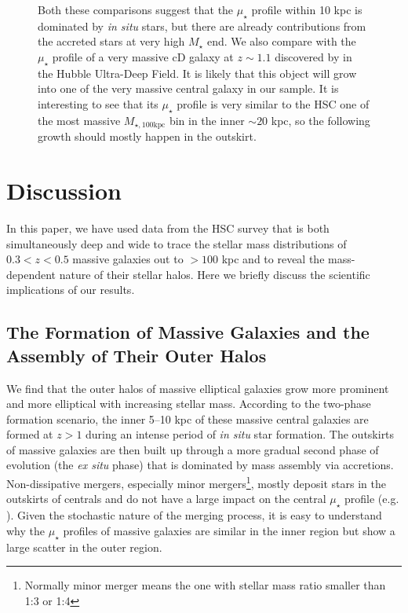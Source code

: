 \documentclass[a4paper,fleqn,usenatbib]{mnras}
\def\mstar{{$M_{\star}$}}
\def\mtot{{$M_{\star,100\mathrm{kpc}}$}}
\def\mden{{$\mu_{\star}$}}
\begin{document}
\begin{figure}
{          Both these comparisons suggest that the \mden{} profile within 10 kpc is 
          dominated by \textit{in situ} stars, but there are already contributions
          from the accreted stars at very high \mstar{} end. 
          We also compare with the \mden{} profile of a very massive cD galaxy at
          $z{\sim} 1.1$ discovered by \citet[][Yellow, dashed]{Liu2013} in the Hubble 
          Ultra-Deep Field. 
          It is likely that this object will grow into one of the very massive central
          galaxy in our sample.
          It is interesting to see that its \mden{} profile is very similar to the 
          HSC one of the most massive \mtot{} bin in the inner $\sim 20$ kpc, so the 
          following growth should mostly happen in the outskirt. 
          }
      \label{fig:discussion_1}
  \end{figure}

\section{Discussion}
    \label{sec:discussion}
    
    In this paper, we have used data from the HSC survey that is both simultaneously 
    deep and wide to trace the stellar mass distributions of $0.3 < z < 0.5$ massive 
    galaxies out to $>100$ kpc and to reveal the mass-dependent nature of their 
    stellar halos.
    Here we briefly discuss the scientific implications of our results.

\subsection{The Formation of Massive Galaxies and the Assembly of Their Outer Halos}
    \label{ssec:twophase}
            
    We find that the outer halos of massive elliptical galaxies grow more prominent 
    and more elliptical with increasing stellar mass.
    According to the two-phase formation scenario, the inner 5--10 kpc of these 
    massive central galaxies are formed at $z>1$ during an intense period of 
    \textit{in situ} star formation. 
    The outskirts of massive galaxies are then built up through a more gradual second 
    phase of evolution (the \textit{ex situ} phase) that is dominated by mass assembly via 
    accretions.
    Non-dissipative mergers, especially minor mergers\footnote{Normally minor merger
    means the one with stellar mass ratio smaller than 1:3 or 1:4}, mostly deposit stars
    in the outskirts of centrals and do not have a large impact on the central \mden{} 
    profile (e.g. \citealt{BoylanKolchin2008, Oogi2013, Bedorf2013}).
    Given the stochastic nature of the merging process, it is easy to understand why 
    the \mden{} profiles of massive galaxies are similar in the inner region but show
    a large scatter in the outer region. 
        
\end{document}
